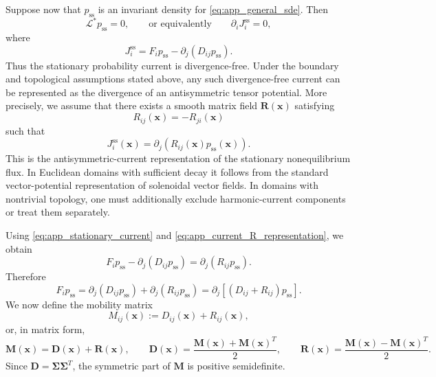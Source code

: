 \documentclass[11pt,twoside,fleqn]{article}
\begin{document}
Suppose now that $p_{\mathrm{ss}}$ is an invariant density for \eqref{eq:app_general_sde}. Then
\begin{equation}
    \mathcal{L}^*p_{\mathrm{ss}}=0,
    \qquad\text{or equivalently}\qquad
    \partial_i J_i^{\mathrm{ss}}=0,
    \label{eq:app_stationary_current_divfree}
\end{equation}
where
\begin{equation}
    J_i^{\mathrm{ss}}
    =
    F_i p_{\mathrm{ss}}
    -
    \partial_j(D_{ij}p_{\mathrm{ss}}).
    \label{eq:app_stationary_current}
\end{equation}
Thus the stationary probability current is divergence-free. Under the boundary and topological assumptions stated above, any such divergence-free current can be represented as the divergence of an antisymmetric tensor potential. More precisely, we assume that there exists a smooth matrix field $\bm{R}(\bm{x})$ satisfying
\begin{equation}
    R_{ij}(\bm{x})=-R_{ji}(\bm{x})
    \label{eq:app_R_antisymmetric}
\end{equation}
such that
\begin{equation}
    J_i^{\mathrm{ss}}(\bm{x})
    =
    \partial_j\!\left(
        R_{ij}(\bm{x})p_{\mathrm{ss}}(\bm{x})
    \right).
    \label{eq:app_current_R_representation}
\end{equation}
This is the antisymmetric-current representation of the stationary nonequilibrium flux. In Euclidean domains with sufficient decay it follows from the standard vector-potential representation of solenoidal vector fields. In domains with nontrivial topology, one must additionally exclude harmonic-current components or treat them separately.

Using \eqref{eq:app_stationary_current} and \eqref{eq:app_current_R_representation}, we obtain
\begin{equation}
    F_i p_{\mathrm{ss}}
    -
    \partial_j(D_{ij}p_{\mathrm{ss}})
    =
    \partial_j(R_{ij}p_{\mathrm{ss}}).
    \label{eq:app_current_balance}
\end{equation}
Therefore
\begin{equation}
    F_i p_{\mathrm{ss}}
    =
    \partial_j(D_{ij}p_{\mathrm{ss}})
    +
    \partial_j(R_{ij}p_{\mathrm{ss}})
    =
    \partial_j\!\left[
        (D_{ij}+R_{ij})p_{\mathrm{ss}}
    \right].
    \label{eq:app_Fp_as_divergence}
\end{equation}
We now define the mobility matrix
\begin{equation}
    M_{ij}(\bm{x})
    :=
    D_{ij}(\bm{x})+R_{ij}(\bm{x}),
    \label{eq:app_mobility_definition}
\end{equation}
or, in matrix form,
\begin{equation}
    \bm{M}(\bm{x})
    =
    \bm{D}(\bm{x})+\bm{R}(\bm{x}),
    \qquad
    \bm{D}(\bm{x})
    =
    \frac{\bm{M}(\bm{x})+\bm{M}(\bm{x})^T}{2},
    \qquad
    \bm{R}(\bm{x})
    =
    \frac{\bm{M}(\bm{x})-\bm{M}(\bm{x})^T}{2}.
    \label{eq:app_mobility_decomposition}
\end{equation}
Since $\bm{D}=\bm{\Sigma}\bm{\Sigma}^T$, the symmetric part of $\bm{M}$ is positive semidefinite.
\end{document}
